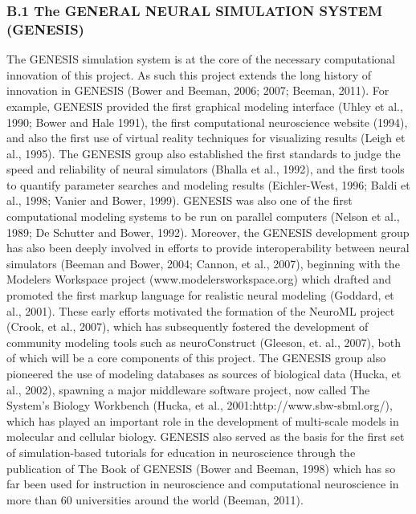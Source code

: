 \documentclass[12pt]{article}
\begin{document}
\subsubsection*{B.1 The GENERAL NEURAL SIMULATION SYSTEM (GENESIS)}

\noindent The GENESIS
simulation system is at the core of the necessary computational innovation
of this project. As such this project extends the long history of
innovation in GENESIS (Bower and Beeman, 2006; 2007;
Beeman, 2011). For example, GENESIS provided the first graphical
modeling interface (Uhley et al., 1990; Bower and Hale 1991), the
first computational neuroscience website (1994), and also the first
use of virtual reality techniques for visualizing results (Leigh et
al., 1995). The GENESIS group also established the first standards to
judge the speed and reliability of neural simulators (Bhalla et al.,
1992), and the first tools to quantify parameter searches and modeling
results (Eichler-West, 1996; Baldi et al., 1998; Vanier and Bower,
1999). GENESIS was also one of the first computational modeling
systems to be run on parallel computers (Nelson et al., 1989; De
Schutter and Bower, 1992). Moreover, the GENESIS development group has
also been deeply involved in efforts to provide interoperability
between neural simulators (Beeman and Bower, 2004; Cannon, et al.,
2007), beginning with the Modelers Workspace project
(www.modelersworkspace.org) which drafted and promoted the first
markup language for realistic neural modeling (Goddard, et al., 2001).
These early efforts motivated the formation of the NeuroML project
(Crook, et al., 2007), which has subsequently fostered the development
of community modeling tools such as neuroConstruct (Gleeson, et. al.,
2007), both of which will be a core components of this project. The GENESIS
group also pioneered the use of modeling databases as sources of
biological data (Hucka, et al., 2002), spawning a major middleware
software project, now called The System's Biology Workbench (Hucka, et
al., 2001:http://www.sbw-sbml.org/), which has played an important
role in the development of multi-scale models in molecular and
cellular biology. GENESIS also served as the basis for the first set
of simulation-based tutorials for education in neuroscience through
the publication of The Book of GENESIS (Bower and Beeman, 1998) which
has so far been used for instruction in neuroscience and computational
neuroscience in more than 60 universities around the world (Beeman,
2011). %
\end{document}
